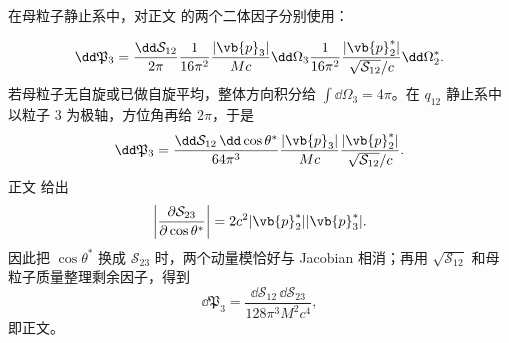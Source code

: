 \begin{derivation}
在母粒子静止系中，对正文 的两个二体因子分别使用：

\begin{equation*}
\dd\mathfrak P_3
=\frac{\dd\mathcal S_{12}}{2\pi}
\frac{1}{16\pi^2}\frac{|\vb{p}_3|}{Mc}\dd\Omega_3
\frac{1}{16\pi^2}\frac{|\vb{p}_2^*|}{\sqrt{\mathcal S_{12}}/c}\dd\Omega_2^*.
\end{equation*}
若母粒子无自旋或已做自旋平均，整体方向积分给 $\int\dd\Omega_3=4\pi$。在 $q_{12}$ 静止系中以粒子 3 为极轴，方位角再给 $2\pi$，于是
\begin{equation*}
\dd\mathfrak P_3
=\frac{\dd\mathcal S_{12}\,\dd\cos\theta^*}{64\pi^3}
\frac{|\vb{p}_3|}{Mc}
\frac{|\vb{p}_2^*|}{\sqrt{\mathcal S_{12}}/c}.
\end{equation*}
正文 给出
\begin{equation*}
\left|\frac{\partial\mathcal S_{23}}{\partial\cos\theta^*}\right|
=2c^2|\vb{p}_2^*||\vb{p}_3^*|.
\end{equation*}
因此把 $\cos\theta^*$ 换成 $\mathcal S_{23}$ 时，两个动量模恰好与 Jacobian 相消；再用 $\sqrt{\mathcal S_{12}}$ 和母粒子质量整理剩余因子，得到
\begin{equation*}
\dd\mathfrak P_3
=\frac{\dd\mathcal S_{12}\,\dd\mathcal S_{23}}{128\pi^3M^2c^4},
\end{equation*}
即正文。
\end{derivation}

